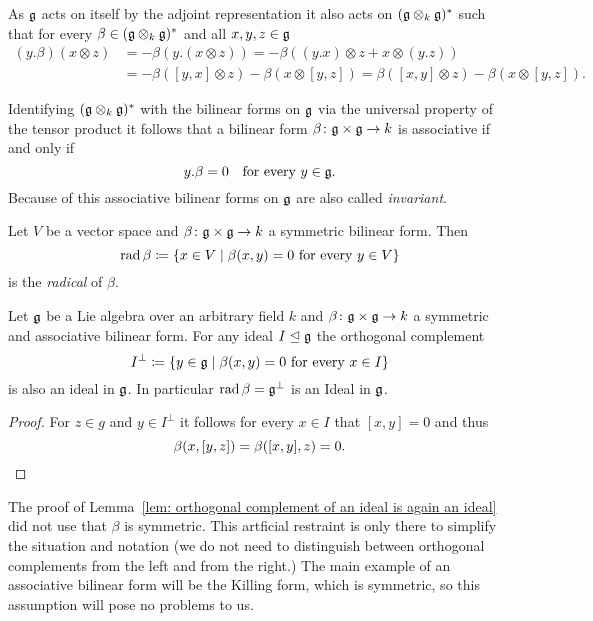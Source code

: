 \begin{rem}
 As $\mathfrak{g}$ acts on itself by the adjoint representation it also acts on $(\mathfrak{g} \otimes_k \mathfrak{g})^*$ such that for every $\beta \in (\mathfrak{g} \otimes_k \mathfrak{g})^*$ and all $x,y,z \in \mathfrak{g}$
 \begin{align*}
  (y.\beta)(x \otimes z)
  &= -\beta(y.(x \otimes z))
  = -\beta((y.x) \otimes z + x \otimes (y.z)) \\
  &= -\beta([y,x] \otimes z) -\beta(x \otimes [y,z])
  = \beta([x,y] \otimes z) - \beta(x \otimes [y,z]).
 \end{align*}
 
 \begin{samepage} Identifying $(\mathfrak{g} \otimes_k \mathfrak{g})^*$ with the bilinear forms on $\mathfrak{g}$ via the universal property of the tensor product it follows that a bilinear form $\beta \colon \mathfrak{g} \times \mathfrak{g} \to k$ is associative if and only if
 \[
  y.\beta = 0 \quad \text{for every $y \in \mathfrak{g}$}.
 \]
 Because of this associative bilinear forms on $\mathfrak{g}$ are also called \emph{invariant}. \end{samepage}
\end{rem}



\begin{defi}
 Let $V$ be a vector space and $\beta \colon \mathfrak{g} \times \mathfrak{g} \to k$ a symmetric bilinear form. Then
 \[
  \operatorname{rad} \beta \coloneqq \{x \in V \mid \text{$\beta(x,y) = 0$ for every $y \in V$}\}
 \]
 is the \emph{radical} of $\beta$.
\end{defi}


\begin{lem}\label{lem: orthogonal complement of an ideal is again an ideal}
 Let $\mathfrak{g}$ be a Lie algebra over an arbitrary field $k$ and \mbox{$\beta \colon \mathfrak{g} \times \mathfrak{g} \to k$} a symmetric and associative bilinear form. For any ideal $I \trianglelefteq \mathfrak{g}$ the orthogonal complement
 \[
  I^\perp \coloneqq \{y \in \mathfrak{g} \mid \text{$\beta(x,y) = 0$ for every $x \in I$}\}
 \]
 is also an ideal in $\mathfrak{g}$. In particular $\operatorname{rad} \beta = \mathfrak{g}^\perp$ is an Ideal in $\mathfrak{g}$.
\end{lem}
\begin{proof}
 For $z \in g$ and $y \in I^\perp$ it follows for every $x \in I$ that $[x,y] = 0$ and thus
 \[
  \beta(x,[y,z]) = \beta([x,y],z) = 0.
  \qedhere
 \]
\end{proof}


\begin{rem}
 The proof of Lemma~\ref{lem: orthogonal complement of an ideal is again an ideal} did not use that $\beta$ is symmetric. This artficial restraint is only there to simplify the situation and notation (we do not need to distinguish between orthogonal complements from the left and from the right.) The main example of an associative bilinear form will be the Killing form, which is symmetric, so this assumption will pose no problems to us.
\end{rem}


